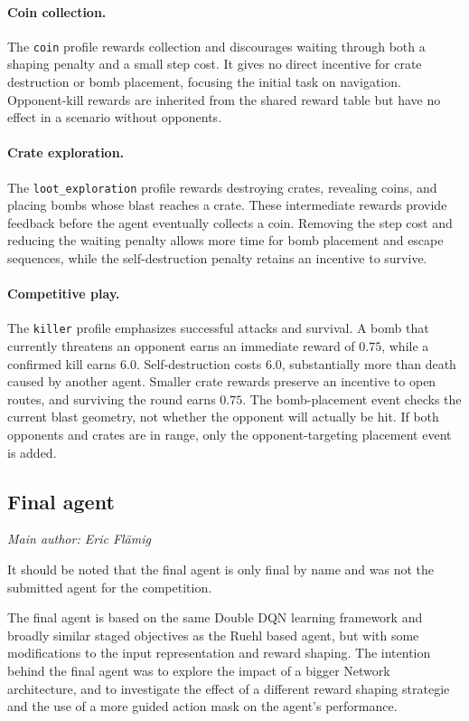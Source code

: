 \documentclass[11pt,a4paper]{article}
\newcommand{\contributionauthor}[1]{{\small\textit{Main author: #1}\par}}
\begin{document}
\paragraph{Coin collection.}
The \texttt{coin} profile rewards collection and discourages waiting through
both a shaping penalty and a small step cost. It gives no direct incentive
for crate destruction or bomb placement, focusing the initial task on
navigation. Opponent-kill rewards are inherited from the shared reward table
but have no effect in a scenario without opponents.

\paragraph{Crate exploration.}
The \texttt{loot\_exploration} profile rewards destroying crates, revealing
coins, and placing bombs whose blast reaches a crate. These intermediate
rewards provide feedback before the agent eventually collects a coin.
Removing the step cost and reducing the waiting penalty allows more time
for bomb placement and escape sequences, while the self-destruction penalty
retains an incentive to survive.

\paragraph{Competitive play.}
The \texttt{killer} profile emphasizes successful attacks and survival. A
bomb that currently threatens an opponent earns an immediate reward of
$0.75$, while a confirmed kill earns $6.0$. Self-destruction costs $6.0$,
substantially more than death caused by another agent. Smaller crate rewards
preserve an incentive to open routes, and surviving the round earns $0.75$.
The bomb-placement event checks the current blast geometry, not whether the
opponent will actually be hit. If both opponents and crates are in range,
only the opponent-targeting placement event is added.

\subsection{Final agent}\label{sec:final-methods}
\contributionauthor{Eric Flämig}

It should be noted that the final agent is only final by name and was not the submitted agent for the competition.

The final agent is based on the same Double DQN learning framework and broadly similar staged objectives as the Ruehl based agent, but with some modifications to the input representation and reward shaping. The intention behind the final agent was to explore the impact of a bigger Network architecture, and to investigate the effect of a different reward shaping strategie and the use of a more guided action mask on the agent's performance.
\end{document}
